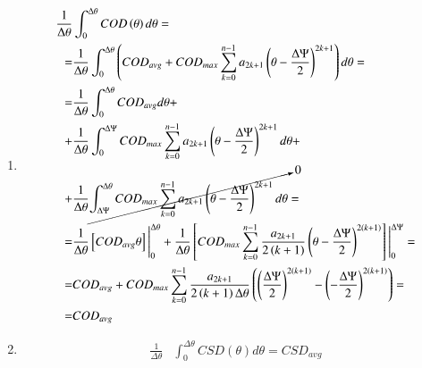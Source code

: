 \documentclass[review]{elsarticle}
\begin{document}
\begin{enumerate}

\item 
\begin{equation}
\begin{aligned}
\frac{1}{\Delta\theta}&\int_{0}^{\Delta\theta}COD\left(\theta\right)d\theta=\\
=&\frac{1}{\Delta\theta}\int_{0}^{\Delta\theta}\left(COD_{avg}+COD_{max}\sum_{k=0}^{n-1}a_{2k+1}\left(\theta-\frac{\Delta\Psi}{2}\right)^{2k+1}\right)d\theta=\\
=&\frac{1}{\Delta\theta}\int_{0}^{\Delta\theta}COD_{avg}d\theta+\\
+&\frac{1}{\Delta\theta}\int_{0}^{\Delta\Psi}COD_{max}\sum_{k=0}^{n-1}a_{2k+1}\left(\theta-\frac{\Delta\Psi}{2}\right)^{2k+1}d\theta+\\
+&\frac{1}{\Delta\theta}\cancelto{0}{\int_{\Delta\Psi}^{\Delta\theta}COD_{max}\sum_{k=0}^{n-1}a_{2k+1}\left(\theta-\frac{\Delta\Psi}{2}\right)^{2k+1}d\theta}=\\
=&\frac{1}{\Delta\theta}\left[COD_{avg}\theta\right]\Bigg\rvert_{0}^{\Delta\theta}+\frac{1}{\Delta\theta}\left[COD_{max}\sum_{k=0}^{n-1}\frac{a_{2k+1}}{2\left(k+1\right)}\left(\theta-\frac{\Delta\Psi}{2}\right)^{2\left(k+1\right)}\right]\Bigg\rvert_{0}^{\Delta\Psi}=\\
=&COD_{avg}+COD_{max}\sum_{k=0}^{n-1}\frac{a_{2k+1}}{2\left(k+1\right)\Delta\theta}\left(\left(\frac{\Delta\Psi}{2}\right)^{2\left(k+1\right)}-\left(-\frac{\Delta\Psi}{2}\right)^{2\left(k+1\right)}\right)=\\
=&COD_{avg}
\end{aligned}
\end{equation}

\item
\begin{equation}
\begin{aligned}
\frac{1}{\Delta\theta}&\int_{0}^{\Delta\theta}CSD\left(\theta\right)d\theta=CSD_{avg}
\end{aligned}
\end{equation}


\end{enumerate}
\end{document}
